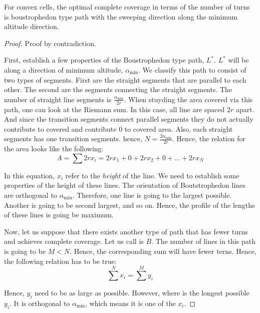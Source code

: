 \documentclass[../main.tex]{subfiles}
\begin{document}
\begin{theorem}
	For convex cells, the optimal complete coverage in terms of the number of turns is boustrophedon type path with the sweeping direction along the minimum altitude direction.
\end{theorem}
\begin{proof}
	Proof by contradiction.

First, establish a few properties of the Boustrophedon type path, $L^*$. $L^*$ will be along a direction of minimum altitude, $\alpha_{\min}$. We classify this path to consist of two types of segments. First are the straight segments that are parallel to each other. The second are the segments connecting the straight segments. The number of straight line segments is $\frac{\alpha_{\min}}{2r}$. When stuyding the area covered via this path, one can look at the Riemann sum. In this case, all line are spaced $2r$ apart. And since the transition segments connect parallel segments they do not actually contribute to covered and contribute $0$ to covered area. Also, each straight segments has one transition segments. hence, $N=\frac{2\alpha_{\min}}{2r}$. Hence, the relation for the area looks like the following:
\begin{equation}
		A=\sum2rx_i=2rx_1+0+2rx_2+0+\ldots+2rx_N
\end{equation}

In this equation, $x_i$ refer to the \emph{height} of the line. We need to establish some properties of the height of these lines. The orientation of Boutstrophedon lines are orthogonal to $\alpha_{\min}$. Therefore, one line is going to the largest possible. Another is going to be second largest, and so on. Hence, the profile of the lengths of these lines is going be maximum. 

Now, let us suppose that there exists another type of path that has fewer turns and achieves complete coverage. Let us call is $B$. The number of lines in this path is going to be $M<N$. Hence, the corresponding sum will have fewer terns. Hence, the following relation has to be true:
\begin{equation}
	\sum^Nx_i=\sum^My_i
\end{equation}

Hence, $y_i$ need to be as large as possible. However, where is the longest possible $y_i$. It is orthogonal to $\alpha_{\min}$, which means it is one of the $x_i$.
\end{proof}
\end{document}
